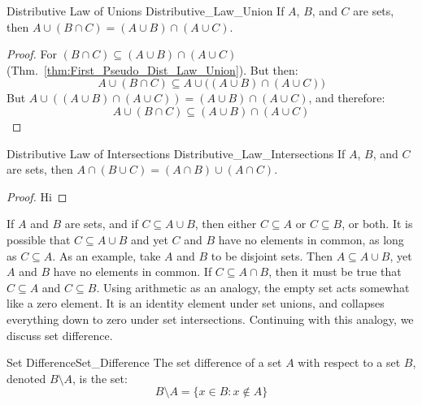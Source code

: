         \newpage
        \begin{ltheorem}{Distributive Law of Unions}
              {Distributive_Law_Union}
            If $A$, $B$, and $C$ are sets, then
            $A\cup(B\cap{C})=(A\cup{B})\cap(A\cup{C})$.
        \end{ltheorem}
        \begin{proof}
            For $(B\cap{C})\subseteq(A\cup{B})\cap(A\cup{C})$
            (Thm.~\ref{thm:First_Pseudo_Dist_Law_Union}).
            But then:
            \begin{equation}
                A\cup(B\cap{C})\subseteq
                A\cup\Big((A\cup{B})\cap(A\cup{C})\Big)
            \end{equation}
            But $A\cup((A\cup{B})\cap(A\cup{C}))%
                 =(A\cup{B})\cap(A\cup{C})$, and therefore:
            \begin{equation}
                A\cup(B\cap{C})\subseteq
                (A\cup{B})\cap(A\cup{C})
            \end{equation}
        \end{proof}
        \begin{ltheorem}{Distributive Law of Intersections}
              {Distributive_Law_Intersections}
            If $A$, $B$, and $C$ are sets, then
            $A\cap(B\cup{C})=(A\cap{B})\cup(A\cap{C})$.
        \end{ltheorem}
        \begin{proof}
            Hi
        \end{proof}
        If $A$ and $B$ are sets, and if
        $C\subseteq{A}\cup{B}$, then
        either $C\subseteq{A}$ or $C\subseteq{B}$, or both.
        It is possible that $C\subseteq{A}\cup{B}$ and yet
        $C$ and $B$ have no elements in common, as long
        as $C\subseteq{A}$. As an example,
        take $A$ and $B$ to be disjoint sets. Then
        $A\subseteq{A}\cup{B}$, yet $A$ and $B$ have no
        elements in common. If $C\subseteq{A}\cap{B}$, then
        it must be true that $C\subseteq{A}$ and
        $C\subseteq{B}$.
        Using arithmetic as an analogy, the empty set
        acts somewhat like a zero element. It is an identity
        element under set unions, and collapses everything
        down to zero under set intersections. Continuing
        with this analogy, we discuss set difference.
        \begin{ldefinition}{Set Difference}{Set_Difference}
            The set difference of a set $A$ with respect to
            a set $B$, denoted $B\setminus{A}$, is the set:
            \begin{equation}
                B\setminus{A}=\{x\in{B}:x\notin{A}\}
            \end{equation}
        \end{ldefinition}
